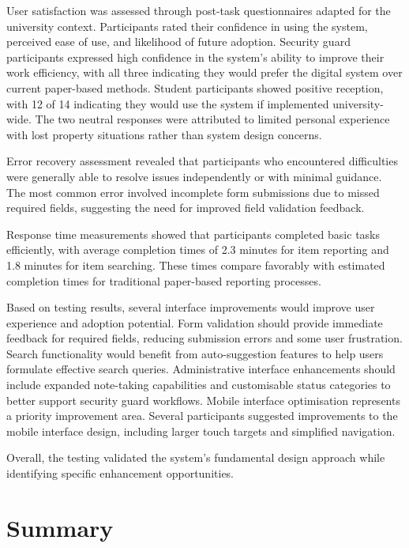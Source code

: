 User satisfaction was assessed through post-task questionnaires adapted for the university context. Participants rated their confidence in using the system, perceived ease of use, and likelihood of future adoption. Security guard participants expressed high confidence in the system's ability to improve their work efficiency, with all three indicating they would prefer the digital system over current paper-based methods. Student participants showed positive reception, with 12 of 14 indicating they would use the system if implemented university-wide. The two neutral responses were attributed to limited personal experience with lost property situations rather than system design concerns.

Error recovery assessment revealed that participants who encountered difficulties were generally able to resolve issues independently or with minimal guidance. The most common error involved incomplete form submissions due to missed required fields, suggesting the need for improved field validation feedback.

Response time measurements showed that participants completed basic tasks efficiently, with average completion times of 2.3 minutes for item reporting and 1.8 minutes for item searching. These times compare favorably with estimated completion times for traditional paper-based reporting processes.

Based on testing results, several interface improvements would improve user experience and adoption potential. Form validation should provide immediate feedback for required fields, reducing submission errors and some user frustration. Search functionality would benefit from auto-suggestion features to help users formulate effective search queries. Administrative interface enhancements should include expanded note-taking capabilities and customisable status categories to better support security guard workflows. Mobile interface optimisation represents a priority improvement area. Several participants suggested improvements to the mobile interface design, including larger touch targets and simplified navigation.

Overall, the testing validated the system's fundamental design approach while identifying specific enhancement opportunities.

\section{Summary} \label{section:testing_summary}

